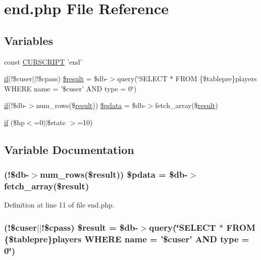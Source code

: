\hypertarget{end_8php}{\section{end.\+php File Reference}
\label{end_8php}
}
\subsection*{Variables}
\begin{DoxyCompactItemize}
\item 
const \hyperlink{end_8php_a39c39f525eceb86cabc338804f230e80}{C\+U\+R\+S\+C\+R\+I\+P\+T} 'end'
\item 
\hyperlink{login__old_8php_a4ac1118c2e44c513a674bc1793ba6c90}{if}(!\$cuser$\vert$$\vert$!\$cpass) \hyperlink{end_8php_aa26a75c10464e039aa68f93507070136}{\$result} = \$db-\/$>$query(\char`\"{}S\+E\+L\+E\+C\+T $\ast$ F\+R\+O\+M \{\$tablepre\}players W\+H\+E\+R\+E name = '\$cuser' A\+N\+D type = 0\char`\"{})
\item 
\hyperlink{login__old_8php_a4ac1118c2e44c513a674bc1793ba6c90}{if}(!\$db-\/$>$num\+\_\+rows(\$\hyperlink{templates_2install_8php_abdecde238169a1e34f68354fc9968af0}{result})) \hyperlink{end_8php_a6378350bbbdfdf1fdd8c8e1cd0607a8d}{\$pdata} = \$db-\/$>$fetch\+\_\+array(\$\hyperlink{templates_2install_8php_abdecde238169a1e34f68354fc9968af0}{result})
\item 
\hyperlink{end_8php_afc70e9ccbdea0a41fcb004c77b7c7c24}{if} (\$hp$<$=0$\vert$$\vert$\$state $>$=10)
\end{DoxyCompactItemize}


\subsection{Variable Documentation}
\hypertarget{end_8php_a6378350bbbdfdf1fdd8c8e1cd0607a8d}{
\subsubsection[{\$pdata}]{ (!\$db-\/$>$num\+\_\+rows(\${\bf result})) \$pdata = \$db-\/$>$fetch\+\_\+array(\${\bf result})}}\label{end_8php_a6378350bbbdfdf1fdd8c8e1cd0607a8d}


Definition at line 11 of file end.\+php.

\hypertarget{end_8php_aa26a75c10464e039aa68f93507070136}{
\subsubsection[{\$result}]{ (!\$cuser$\vert$$\vert$!\$cpass) \${\bf result} = \$db-\/$>$query(\char`\"{}S\+E\+L\+E\+C\+T $\ast$ F\+R\+O\+M \{\$tablepre\}players W\+H\+E\+R\+E name = '\$cuser' A\+N\+D type = 0\char`\"{})}}\label{end_8php_aa26a75c10464e039aa68f93507070136}


